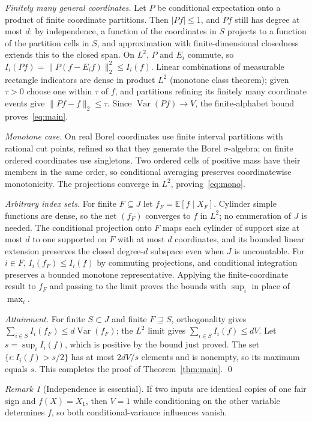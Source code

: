\documentclass[11pt]{article}
\numberwithin{equation}{section}
\newcommand{\E}{\mathbb{E}}
\newcommand{\V}{\operatorname{Var}}
\theoremstyle{plain}
\theoremstyle{remark}
\newtheorem{remark}[theorem]{Remark}
\begin{document}
\emph{Finitely many general coordinates.} Let $P$ be conditional expectation onto a product of finite coordinate partitions. Then $|Pf|\le1$, and $Pf$ still has degree at most $d$: by independence, a function of the coordinates in $S$ projects to a function of the partition cells in $S$, and approximation with finite-dimensional closedness extends this to the closed span. On $L^2$, $P$ and $E_i$ commute, so $I_i(Pf)=\|P(f-E_if)\|_2^2\le I_i(f)$. Linear combinations of measurable rectangle indicators are dense in product $L^2$ (monotone class theorem); given $\tau>0$ choose one within $\tau$ of $f$, and partitions refining its finitely many coordinate events give $\|Pf-f\|_2\le\tau$. Since $\V(Pf)\to V$, the finite-alphabet bound proves~\eqref{eq:main}.

\emph{Monotone case.} On real Borel coordinates use finite interval partitions with rational cut points, refined so that they generate the Borel $\sigma$-algebra; on finite ordered coordinates use singletons. Two ordered cells of positive mass have their members in the same order, so conditional averaging preserves coordinatewise monotonicity. The projections converge in $L^2$, proving~\eqref{eq:mono}.

\emph{Arbitrary index sets.} For finite $F\subseteq J$ let $f_F=\E[f\mid X_F]$. Cylinder simple functions are dense, so the net $(f_F)$ converges to $f$ in $L^2$; no enumeration of $J$ is needed. The conditional projection onto $F$ maps each cylinder of support size at most $d$ to one supported on $F$ with at most $d$ coordinates, and its bounded linear extension preserves the closed degree-$d$ subspace even when $J$ is uncountable. For $i\in F$, $I_i(f_F)\le I_i(f)$ by commuting projections, and conditional integration preserves a bounded monotone representative. Applying the finite-coordinate result to $f_F$ and passing to the limit proves the bounds with $\sup_i$ in place of $\max_i$.

\emph{Attainment.} For finite $S\subset J$ and finite $F\supseteq S$, orthogonality gives $\sum_{i\in S}I_i(f_F)\le d\V(f_F)$; the $L^2$ limit gives $\sum_{i\in S}I_i(f)\le dV$. Let $s=\sup_iI_i(f)$, which is positive by the bound just proved. The set $\{i:I_i(f)>s/2\}$ has at most $2dV/s$ elements and is nonempty, so its maximum equals $s$. This completes the proof of Theorem~\ref{thm:main}. \qed

\begin{remark}[Independence is essential]
If two inputs are identical copies of one fair sign and $f(X)=X_1$, then $V=1$ while conditioning on the other variable determines $f$, so both conditional-variance influences vanish.
\end{remark}
\end{document}
